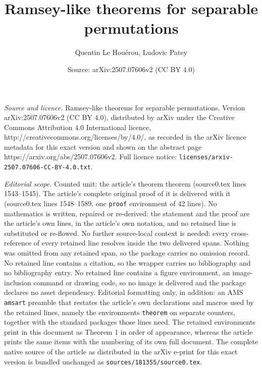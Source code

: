 \documentclass[10pt,a4paper]{amsart}
\title{Ramsey-like theorems for separable permutations}
\author{Quentin Le Hou\'erou, Ludovic Patey}
\date{Source: arXiv:2507.07606v2 (CC BY 4.0)}
\newtheorem{theorem}{Theorem}
\newcommand{\NN}[0]{\mathbb{N}}
\begin{document}
\maketitle

\noindent\emph{Source and licence.} Ramsey-like theorems for separable permutations. Version arXiv:2507.07606v2 (CC BY 4.0), distributed by arXiv under the Creative Commons Attribution 4.0 International licence, http://creativecommons.org/licenses/by/4.0/, as recorded in the arXiv licence metadata for this exact version and shown on the abstract page https://arxiv.org/abs/2507.07606v2. Full licence notice: \texttt{licenses/arxiv-2507.07606-CC-BY-4.0.txt}.\par\smallskip

\noindent\textit{Editorial scope.} Counted unit: the article's theorem theorem (source0.tex lines 1543--1545). The article's complete original proof of it is delivered with it (source0.tex lines 1548--1589, one \texttt{proof} environment of 42 lines). No mathematics is written, repaired or re-derived: the statement and the proof are the article's own lines, in the article's own notation, and no retained line is substituted or re-flowed.  No further source-local context is needed: every cross-reference of every retained line resolves inside the two delivered spans.  Nothing was omitted from any retained span, so the package carries no omission record.  No retained line contains a citation, so the wrapper carries no bibliography and no bibliography entry.  No retained line contains a figure environment, an image-inclusion command or drawing code, so no image is delivered and the package declares no asset dependency.  Editorial formatting only, in addition: an AMS \texttt{amsart} preamble that restates the article's own declarations and macros used by the retained lines, namely the environments \texttt{theorem} on separate counters, together with the standard packages those lines need.  The retained environments print in this document as Theorem 1 in order of appearance, whereas the article prints the same items with the numbering of its own full document.  The complete native source of the article as distributed in the arXiv e-print for this exact version is bundled unchanged as \texttt{sources/181355/source0.tex}.
\end{document}
